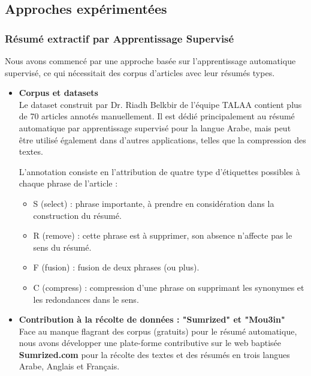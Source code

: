     \subsection{Approches expérimentées}
        \subsubsection{Résumé extractif par Apprentissage Supervisé}
            Nous avons commencé par une approche basée sur l'apprentissage automatique supervisé, ce qui nécessitait des corpus d'articles avec leur résumés types.

            \begin{itemize}[leftmargin=*]
                \item{\textbf{Corpus et datasets}}\\
                Le dataset construit par Dr. Riadh Belkbir de l'équipe TALAA contient plus de 70 articles annotés manuellement. Il est dédié principalement au résumé automatique par apprentissage supervisé pour la langue Arabe, mais peut être utilisé également dans d'autres applications, telles que la compression des textes.

                L'annotation consiste en l'attribution de quatre type d’étiquettes possibles à chaque phrase de l'article :
                \begin{itemize}
                    \item S (select) : phrase importante, à prendre en considération dans la construction du résumé.
                    \item R (remove) : cette phrase est à supprimer, son absence n'affecte pas le sens du résumé.
                    \item F (fusion) : fusion de deux phrases (ou plus).
                    \item C (compress) : compression d'une phrase on supprimant les synonymes et les redondances dans le sens.\\
                \end{itemize}
                \item{\textbf{Contribution à la récolte de données : "Sumrized" et "Mou3in"}}\\
                Face au manque flagrant des corpus (gratuits) pour le résumé automatique, nous avons développer une plate-forme contributive sur le web baptisée \textbf{Sumrized.com} pour la récolte des textes et des résumés en trois langues Arabe, Anglais et Français. 


\end{itemize}
